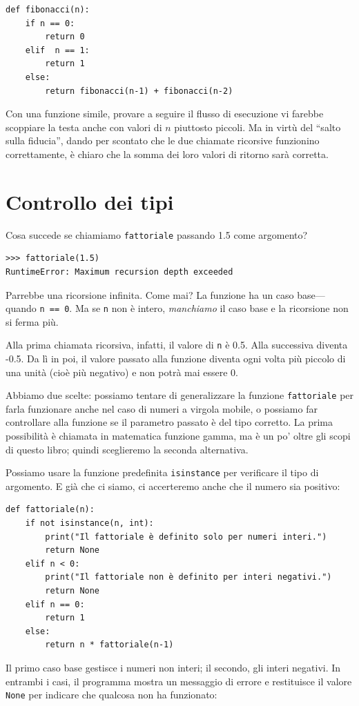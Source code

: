 \documentclass[10pt]{book}
\begin{document}
\begin{verbatim}
def fibonacci(n):
    if n == 0:
        return 0
    elif  n == 1:
        return 1
    else:
        return fibonacci(n-1) + fibonacci(n-2)
\end{verbatim}
%
Con una funzione simile, provare a seguire il flusso di esecuzione vi farebbe scoppiare la testa anche con valori di $n$ piuttosto piccoli. Ma in virtù del ``salto sulla fiducia'', dando per scontato che le due chiamate ricorsive funzionino correttamente, è chiaro che la somma dei loro valori di ritorno sarà corretta.


\section{Controllo dei tipi}
\label{guardian}

Cosa succede se chiamiamo {\tt fattoriale} passando 1.5 come argomento?

\begin{verbatim}
>>> fattoriale(1.5)
RuntimeError: Maximum recursion depth exceeded
\end{verbatim}
%
Parrebbe una ricorsione infinita. Come mai?
La funzione ha un caso base---quando {\tt n == 0}.  Ma se {\tt n} non è intero,
{\em manchiamo} il caso base e la ricorsione non si ferma più.

Alla prima chiamata ricorsiva, infatti, il valore di {\tt n} è 0.5.
Alla successiva diventa -0.5. Da lì in poi, il valore passato alla funzione diventa ogni volta più piccolo di una unità (cioè più negativo) e non potrà mai essere 0.

Abbiamo due scelte: possiamo tentare di generalizzare la funzione {\tt fattoriale} per farla funzionare anche nel caso di numeri a virgola mobile, o possiamo far controllare alla funzione se il parametro passato è del tipo corretto. La prima possibilità è chiamata in matematica funzione gamma, ma è un po' oltre gli scopi di questo libro; quindi sceglieremo la seconda alternativa.

Possiamo usare la funzione predefinita {\tt isinstance} per verificare il tipo di argomento. E già che ci siamo, ci accerteremo anche che il numero sia positivo:

\begin{verbatim}
def fattoriale(n):
    if not isinstance(n, int):
        print("Il fattoriale è definito solo per numeri interi.")
        return None
    elif n < 0:
        print("Il fattoriale non è definito per interi negativi.")
        return None
    elif n == 0:
        return 1
    else:
        return n * fattoriale(n-1)
\end{verbatim}
%
Il primo caso base gestisce i numeri non interi; il secondo, gli interi negativi. In entrambi i casi, il programma mostra un messaggio di errore e restituisce il valore {\tt None} per indicare che qualcosa non ha funzionato:
\end{document}
